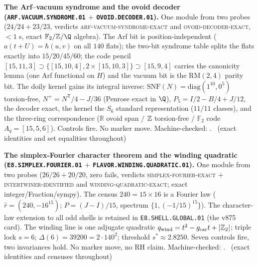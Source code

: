 \par\smallskip\noindent\textbf{The Arf--vacuum syndrome and the
ovoid decoder (\texttt{ARF.VACUUM.SYNDROME.01} $+$
\texttt{OVOID.DECODER.01}).}
One module from two probes ($24/24 + 23/23$, verdicts
\textsc{arf-vacuum-syndrome-exact} and
\textsc{ovoid-decoder-exact}, ${<}1$ s, exact
$\mathbb{F}_2/\Z/\Q$ algebra).  The Arf bit is position-independent
($a(t{+}U) = \hbar(u,v)$ on all $140$ flats); the two-bit
syndrome table splits the flats exactly into $15/20/45/60$; the
code pencil $[15,11,3] \supset
\{[15,10,4], 2\times[15,10,3]\} \supset [15,9,4]$ carries the
canonicity lemma (one Arf functional on $H$) and the vacuum bit
is the $\mathrm{RM}(2,4)$ parity bit.  The doily kernel gains
its integral inverse: $\mathrm{SNF}(N) = \mathrm{diag}(1^{10},
0^5)$ torsion-free, $N^{+} = N^{\mathsf T}/4 - J/36$ (Penrose
exact in $\Q$), $P_5 = I/2 - B/4 + J/12$, the decoder exact, the
kernel the $S_6$ standard representation ($11/11$ classes), and
the three-ring correspondence ($\mathbb{R}$ ovoid span $/$ $\mathbb{Z}$
torsion-free $/$ $\mathbb{F}_2$ code $A_q = [15,5,6]$).  Controls fire.
No marker move.
Machine-checked: .
\mE\ (exact identities and set equalities throughout)
\par\smallskip

\par\smallskip\noindent\textbf{The simplex-Fourier character
theorem and the winding quadratic
(\texttt{E8.SIMPLEX.\allowbreak FOURIER.01} $+$
\texttt{FLAVOR.\allowbreak WINDING.\allowbreak QUADRATIC.01}).}
One module from two probes ($26/26 + 20/20$, zero fails,
verdicts \textsc{simplex-fourier-exact} $+$
\textsc{intertwiner-identified} and
\textsc{winding-quadratic-exact}; exact
integer/Fraction/sympy).  The census $240 = 15\times16$ is a
Fourier law ($\hat r = (240, -16^{15})$; $P = (J - I)/15$,
spectrum $\{1, (-1/15)^{15}\}$). The character-law extension to all odd shells is retained in \texttt{E8.SHELL.GLOBAL.01} (the v875 card).  The winding line is one adjugate
quadratic $q_{\rm wind} = t^2 - g_{\mathrm{car}} t + |\mathbb{Z}_2|$; triple lock
$s = 6$; $\Delta(6) = 39200 = 2\cdot140^2$; threshold
$s^* \approx 2.8250$.  Seven controls fire, two invariances
hold.  No marker move, no RH claim.
Machine-checked: .
\mE\ (exact identities and censuses throughout)
\par\smallskip

